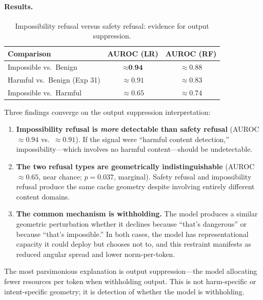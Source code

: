 \paragraph{Results.}

\begin{table}[H]
\centering
\caption{Impossibility refusal versus safety refusal: evidence for output suppression.}
\label{tab:impossibility}
\begin{tabular}{lcc}
\toprule
\textbf{Comparison} & \textbf{AUROC (LR)} & \textbf{AUROC (RF)} \\
\midrule
Impossible vs.\ Benign & $\approx \textbf{0.94}$ & $\approx 0.88$ \\
Harmful vs.\ Benign (Exp 31) & $\approx 0.91$ & $\approx 0.83$ \\
Impossible vs.\ Harmful & $\approx 0.65$ & $\approx 0.74$ \\
\bottomrule
\end{tabular}
\end{table}

Three findings converge on the output suppression interpretation:

\begin{enumerate}[leftmargin=*]
    \item \textbf{Impossibility refusal is \emph{more} detectable than safety refusal} (AUROC $\approx 0.94$ vs.\ $\approx 0.91$). If the signal were ``harmful content detection,'' impossibility---which involves no harmful content---should be undetectable.
    \item \textbf{The two refusal types are geometrically indistinguishable} (AUROC $\approx 0.65$, near chance; $p = 0.037$, marginal). Safety refusal and impossibility refusal produce the same cache geometry despite involving entirely different content domains.
    \item \textbf{The common mechanism is withholding.} The model produces a similar geometric perturbation whether it declines because ``that's dangerous'' or because ``that's impossible.'' In both cases, the model has representational capacity it could deploy but chooses not to, and this restraint manifests as reduced angular spread and lower norm-per-token.
\end{enumerate}

\noindent The most parsimonious explanation is output suppression---the model allocating fewer resources per token when withholding output. This is not harm-specific or intent-specific geometry; it is detection of whether the model is withholding.

